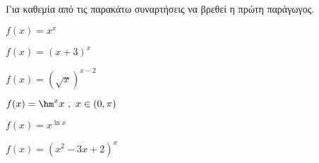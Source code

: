 Για καθεμία από τις παρακάτω συναρτήσεις να βρεθεί η πρώτη παράγωγος.
\begin{multicols}{2}
\begin{alist}
\item $ f(x)=x^x $
\item $ f(x)=(x+3)^x $
\item $ f(x)=\left( \sqrt{x}\right) ^{x-2} $
\item $ f(x)=\hm^x{x}\ ,\ x\in(0,\pi) $
\item $ f(x)=x^{\ln{x}} $
\item $ f(x)=(x^2-3x+2)^{x} $
\end{alist}
\end{multicols}
